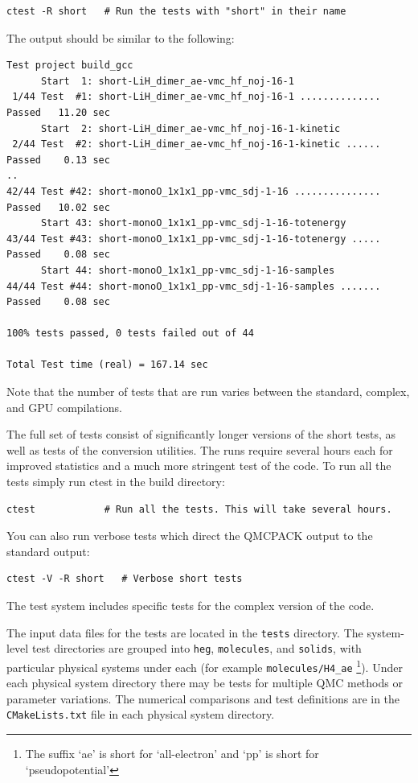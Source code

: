\verbatimfont{\footnotesize}
\begin{verbatim}
ctest -R short   # Run the tests with "short" in their name
\end{verbatim}
The output should be similar to the following:
\verbatimfont{\footnotesize}
\begin{verbatim}
Test project build_gcc
      Start  1: short-LiH_dimer_ae-vmc_hf_noj-16-1
 1/44 Test  #1: short-LiH_dimer_ae-vmc_hf_noj-16-1 ..............  Passed   11.20 sec
      Start  2: short-LiH_dimer_ae-vmc_hf_noj-16-1-kinetic
 2/44 Test  #2: short-LiH_dimer_ae-vmc_hf_noj-16-1-kinetic ......  Passed    0.13 sec
..
42/44 Test #42: short-monoO_1x1x1_pp-vmc_sdj-1-16 ...............  Passed   10.02 sec
      Start 43: short-monoO_1x1x1_pp-vmc_sdj-1-16-totenergy
43/44 Test #43: short-monoO_1x1x1_pp-vmc_sdj-1-16-totenergy .....  Passed    0.08 sec
      Start 44: short-monoO_1x1x1_pp-vmc_sdj-1-16-samples
44/44 Test #44: short-monoO_1x1x1_pp-vmc_sdj-1-16-samples .......  Passed    0.08 sec

100% tests passed, 0 tests failed out of 44

Total Test time (real) = 167.14 sec
\end{verbatim}
Note that the number of tests that are run varies between the
standard, complex, and GPU compilations.

The  full set of tests consist of significantly longer versions of the short
tests, as well as tests of the conversion utilities. The runs require
several hours each for improved statistics and a much more
stringent test of the code. To run all the tests simply run ctest in the build
directory:

\verbatimfont{\footnotesize}
\begin{verbatim}
ctest            # Run all the tests. This will take several hours.
\end{verbatim}

You can also run verbose tests which direct the QMCPACK
output to the standard output:
\verbatimfont{\footnotesize}
\begin{verbatim}
ctest -V -R short   # Verbose short tests
\end{verbatim}

The test system includes specific tests for the complex version of the code.

The input data files for the tests are located in the \texttt{tests} directory.
The system-level test directories are grouped into \texttt{heg}, \texttt{molecules}, and \texttt{solids}, with particular physical systems under each (for example \texttt{molecules/H4\_ae}
\footnote{The suffix `ae' is short for `all-electron' and `pp' is short for `pseudopotential'}).
Under each physical system directory there may be tests for multiple QMC methods or parameter variations.
The numerical comparisons and test definitions are in the \texttt{CMakeLists.txt} file in each physical system directory.

